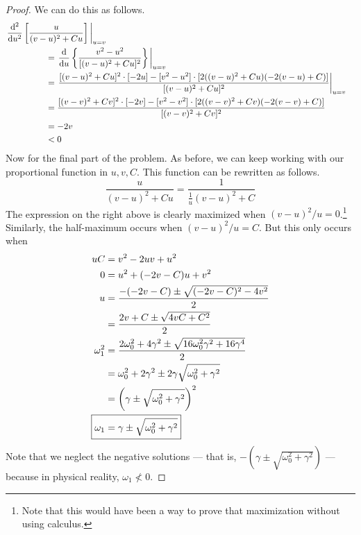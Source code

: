 \documentclass[../psets.tex]{subfiles}
\begin{document}
\begin{enumerate}
\begin{enumerate}
\begin{proof}
            We can do this as follows.
            \begingroup
            \allowdisplaybreaks
            \begin{align*}
                \eval{\dv[2]{u}\left[ \frac{u}{(v-u)^2+Cu} \right]}_{u=v}\hspace{-7em}\\
                &= \eval{\dv{u}\left\{ \frac{v^2-u^2}{[(v-u)^2+Cu]^2} \right\}}_{u=v}\\
                &= \eval{\frac{[(v-u)^2+Cu]^2\cdot[-2u]-[v^2-u^2]\cdot[2((v-u)^2+Cu)(-2(v-u)+C)]}{[(v-u)^2+Cu]^2}}_{u=v}\\
                &= \frac{[(v-v)^2+Cv]^2\cdot[-2v]-[v^2-v^2]\cdot[2((v-v)^2+Cv)(-2(v-v)+C)]}{[(v-v)^2+Cv]^2}\\
                &= -2v\\
                &< 0
            \end{align*}
            \endgroup
            Now for the final part of the problem. As before, we can keep working with our proportional function in $u,v,C$. This function can be rewritten as follows.
            \begin{equation*}
                \frac{u}{(v-u)^2+Cu} = \frac{1}{\frac{1}{u}(v-u)^2+C}
            \end{equation*}
            The expression on the right above is clearly maximized when $(v-u)^2/u=0$.\footnote{Note that this would have been a way to prove that maximization without using calculus.} Similarly, the half-maximum occurs when $(v-u)^2/u=C$. But this only occurs when
            \begin{align*}
                uC &= v^2-2uv+u^2\\
                0 &= u^2+(-2v-C)u+v^2\\
                u &= \frac{-(-2v-C)\pm\sqrt{(-2v-C)^2-4v^2}}{2}\\
                &= \frac{2v+C\pm\sqrt{4vC+C^2}}{2}\\
                \omega_1^2 &= \frac{2\omega_0^2+4\gamma^2\pm\sqrt{16\omega_0^2\gamma^2+16\gamma^4}}{2}\\
                &= \omega_0^2+2\gamma^2\pm 2\gamma\sqrt{\omega_0^2+\gamma^2}\\
                &= \left( \gamma\pm\sqrt{\omega_0^2+\gamma^2} \right)^2\\
                \Aboxed{\omega_1 &= \gamma\pm\sqrt{\omega_0^2+\gamma^2}}
            \end{align*}
            Note that we neglect the negative solutions --- that is, $-(\gamma\pm\sqrt{\omega_0^2+\gamma^2})$ --- because in physical reality, $\omega_1\not<0$.

\end{proof}
\end{enumerate}
\end{enumerate}
\end{document}
